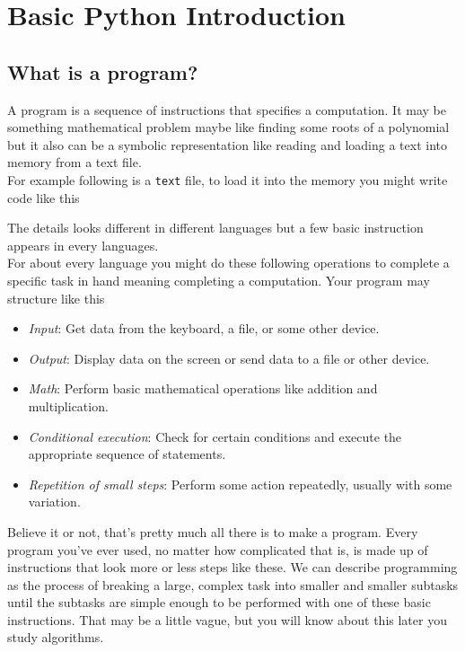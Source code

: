 \chapter{Basic Python Introduction}
\section{What is a program?}
\noindent A program is a sequence of instructions that specifies a computation. It may be something mathematical problem maybe like finding some roots of a polynomial but it also can be a symbolic representation like reading and loading a text into memory from a text file. \\

\noindent For example following is a \texttt{text} file, to load it into the memory you might write code like this

\noindent\begin{minipage}{\linewidth}

\end{minipage}

\noindent The details looks different in different languages but a few basic instruction appears in every languages.\\

\noindent For about every language you might do these following operations to complete a specific task in hand meaning completing a computation. Your program may structure like this
\begin{itemize}
    \item {\sl Input}: Get data from the keyboard, a file, or some other device.
    \item {\sl Output}: Display data on the screen or send data to a file or other device.
    \item {\sl Math}: Perform basic mathematical operations like addition and multiplication.
    \item {\sl Conditional execution}: Check for certain conditions and execute the appropriate sequence of statements.
    \item {\sl Repetition of small steps}: Perform some action repeatedly, usually with some variation.
\end{itemize}

Believe it or not, that’s pretty much all there is to make a program. Every program you’ve ever used, no matter how complicated that is, is made up of instructions that look more or less steps like these. 
We can describe programming as the process of breaking a large, complex task into smaller and smaller subtasks until the subtasks are simple enough to be performed with one of these basic instructions. That may be a little vague, but you will know about this later you study algorithms.

